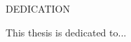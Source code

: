 \begin{center}

\begin{bfseries}

DEDICATION\\

\end{bfseries}

\vspace*{\fill}

\doublespacing

This thesis is dedicated to... \par

\end{center}

\vspace*{\fill}

\pagebreak

\singlespacing
